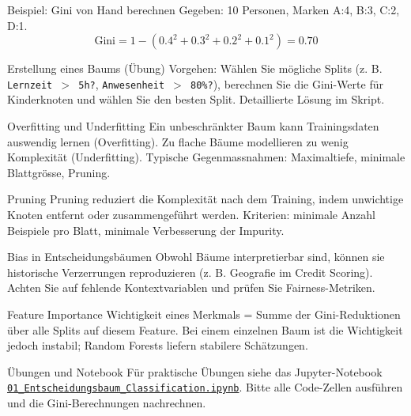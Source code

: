 \begin{frame}{Beispiel: Gini von Hand berechnen}
    Gegeben: 10 Personen, Marken A:4, B:3, C:2, D:1.
    \[   \mathrm{Gini} = 1 - (0.4^2 + 0.3^2 + 0.2^2 + 0.1^2) = 0.70    \]
\end{frame}

\begin{frame}[fragile]{Erstellung eines Baums (Übung)}
    Vorgehen: Wählen Sie mögliche Splits (z. B. \texttt{Lernzeit $>$ 5h?}, \texttt{Anwesenheit $>$ 80\%?}), berechnen Sie die Gini-Werte für Kinderknoten und wählen Sie den besten Split. Detaillierte Lösung im Skript.
\end{frame}

\begin{frame}{Overfitting und Underfitting}
    Ein unbeschränkter Baum kann Trainingsdaten auswendig lernen (Overfitting). Zu flache Bäume modellieren zu wenig Komplexität (Underfitting). Typische Gegenmassnahmen: Maximaltiefe, minimale Blattgrösse, Pruning.
\end{frame}

\begin{frame}{Pruning}
    Pruning reduziert die Komplexität nach dem Training, indem unwichtige Knoten entfernt oder zusammengeführt werden. Kriterien: minimale Anzahl Beispiele pro Blatt, minimale Verbesserung der Impurity.
\end{frame}

\begin{frame}{Bias in Entscheidungsbäumen}
    Obwohl Bäume interpretierbar sind, können sie historische Verzerrungen reproduzieren (z. B. Geografie im Credit Scoring). Achten Sie auf fehlende Kontextvariablen und prüfen Sie Fairness-Metriken.
\end{frame}

\begin{frame}{Feature Importance}
    Wichtigkeit eines Merkmals = Summe der Gini-Reduktionen über alle Splits auf diesem Feature. Bei einem einzelnen Baum ist die Wichtigkeit jedoch instabil; Random Forests liefern stabilere Schätzungen.
\end{frame}

\begin{frame}{Übungen und Notebook}
    Für praktische Übungen siehe das Jupyter-Notebook \href{https://cyrilblum.github.io/FreeFlower/jupyter/}{\texttt{01\_Entscheidungsbaum\_Classification.ipynb}}. Bitte alle Code-Zellen ausführen und die Gini-Berechnungen nachrechnen.
\end{frame}

